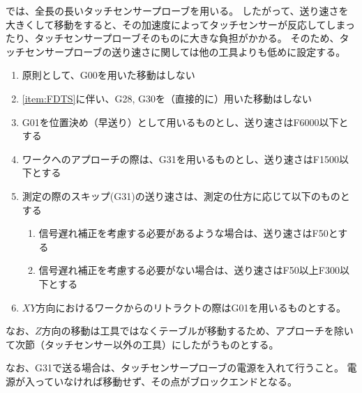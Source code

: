 \clearpage
\DMC では、全長の長いタッチセンサープローブを用いる。
したがって、送り速さを大きくして移動をすると、その加速度によってタッチセンサーが反応してしまったり、タッチセンサープローブそのものに大きな負担がかかる。
そのため、タッチセンサープローブの送り速さに関しては他の工具よりも低めに設定する。
\begin{enumerate}[label=\Roman*., ref=\Roman*]
\item \label{item:FDTS} 原則として、{\ttfamily G00}を用いた移動はしない
\item \ref{item:FDTS}に伴い、{\ttfamily G28}, {\ttfamily G30}を（直接的に）用いた移動はしない
\item {\ttfamily G01}を位置決め（早送り）として用いるものとし、送り速さは{\ttfamily F6000}以下とする
\item ワークへのアプローチの際は、{\ttfamily G31}を用いるものとし、送り速さは{\ttfamily F1500}以下とする
\item 測定の際のスキップ({\ttfamily G31})の送り速さは、測定の仕方に応じて以下のものとする
  \begin{enumerate}
  \item {}信号遅れ補正を考慮する必要があるような場合は、送り速さは{\ttfamily F50}とする
  \item 信号遅れ補正を考慮する必要がない場合は、送り速さは{\ttfamily F50}以上{\ttfamily F300}以下とする
  \end{enumerate}
\item $XY$方向におけるワークからのリトラクトの際は{\ttfamily G01}を用いるものとする。
\end{enumerate}
なお、$Z$方向の移動は工具ではなくテーブルが移動するため、アプローチを除いて次節（タッチセンサー以外の工具）にしたがうものとする。

なお、{\ttfamily G31}で送る場合は、タッチセンサープローブの電源を入れて行うこと。
電源が入っていなければ移動せず、その点がブロックエンドとなる。



